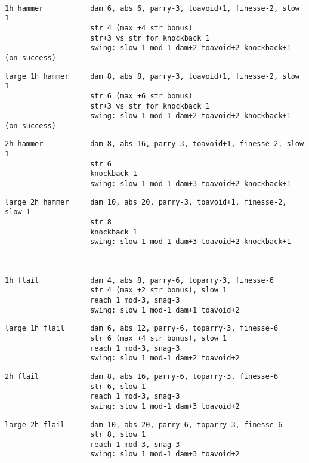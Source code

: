 \

\goodbreak \small \begin{samepage} \begin{verbatim}
1h hammer           dam 6, abs 6, parry-3, toavoid+1, finesse-2, slow 1
                    str 4 (max +4 str bonus)
                    str+3 vs str for knockback 1
                    swing: slow 1 mod-1 dam+2 toavoid+2 knockback+1 (on success)
\end{verbatim} \blocklistgap \begin{verbatim}
large 1h hammer     dam 8, abs 8, parry-3, toavoid+1, finesse-2, slow 1
                    str 6 (max +6 str bonus)
                    str+3 vs str for knockback 1
                    swing: slow 1 mod-1 dam+2 toavoid+2 knockback+1 (on success)
\end{verbatim} \blocklistgap \begin{verbatim}
2h hammer           dam 8, abs 16, parry-3, toavoid+1, finesse-2, slow 1
                    str 6
                    knockback 1
                    swing: slow 1 mod-1 dam+3 toavoid+2 knockback+1
\end{verbatim} \blocklistgap \begin{verbatim}
large 2h hammer     dam 10, abs 20, parry-3, toavoid+1, finesse-2, slow 1
                    str 8
                    knockback 1
                    swing: slow 1 mod-1 dam+3 toavoid+2 knockback+1
\end{verbatim} \end{samepage} \normalsize \goodbreak

\

\goodbreak \small \begin{samepage} \begin{verbatim}
1h flail            dam 4, abs 8, parry-6, toparry-3, finesse-6
                    str 4 (max +2 str bonus), slow 1
                    reach 1 mod-3, snag-3
                    swing: slow 1 mod-1 dam+1 toavoid+2
\end{verbatim} \blocklistgap \begin{verbatim}
large 1h flail      dam 6, abs 12, parry-6, toparry-3, finesse-6
                    str 6 (max +4 str bonus), slow 1
                    reach 1 mod-3, snag-3
                    swing: slow 1 mod-1 dam+2 toavoid+2
\end{verbatim} \blocklistgap \begin{verbatim}
2h flail            dam 8, abs 16, parry-6, toparry-3, finesse-6
                    str 6, slow 1
                    reach 1 mod-3, snag-3
                    swing: slow 1 mod-1 dam+3 toavoid+2
\end{verbatim} \blocklistgap \begin{verbatim}
large 2h flail      dam 10, abs 20, parry-6, toparry-3, finesse-6
                    str 8, slow 1
                    reach 1 mod-3, snag-3
                    swing: slow 1 mod-1 dam+3 toavoid+2
\end{verbatim} \end{samepage} \normalsize \goodbreak


